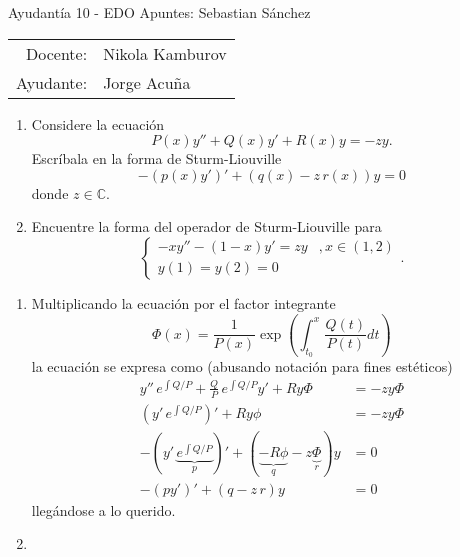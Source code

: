 




{\sc Ayudantía 10 - EDO \hfill \small \rm Apuntes: Sebastian Sánchez}

\begin{center}
    \begin{tabular}{rl}
        Docente:& Nikola Kamburov\\
        Ayudante:& Jorge Acuña
    \end{tabular}
\end{center}

\begin{problema}
    \begin{enumerate}
        \item
        Considere la ecuación
        \[
            P(x)y'' + Q(x)y' + R(x)y = -zy
        .\]
        Escríbala en la forma de Sturm-Liouville
        \[
            -(p(x)y')' + (q(x)-z\,r(x))y = 0
        \]
        donde \(z\in \mathbb{C}\).

        \item
        Encuentre la forma del operador de Sturm-Liouville para
        \[
            \begin{cases}
                -xy''-(1-x)y' = zy &, x\in (1,2)\\
                y(1) = y(2) = 0
            \end{cases}
        .\]
    \end{enumerate}
\end{problema}
\begin{enumerate}
\item
Multiplicando la ecuación por el factor integrante
\[
    \Phi(x) = \frac{1}{P(x)}\exp\left(\int_{t_0}^{x} \frac{Q(t)}{P(t)} dt\right)
\]
la ecuación se expresa como (abusando notación para fines estéticos)
\begin{align*}
    y''\,e^{\int Q/P} + \frac{Q}{P}\,e^{\int Q/P} y' + Ry\Phi &= -zy\Phi\\
    (y'\, e^{\int Q/P})' + Ry\phi &= -zy\Phi\\
    -(y'\, \underbrace{e^{\int Q/P}}_{p})' + (\underbrace{-R\phi}_{q} -
    z\underbrace{\Phi}_{r}) y &= 0\\
    -(py')' + (q-z\,r)y &= 0
\end{align*}
llegándose a lo querido.

\item
\end{enumerate}


